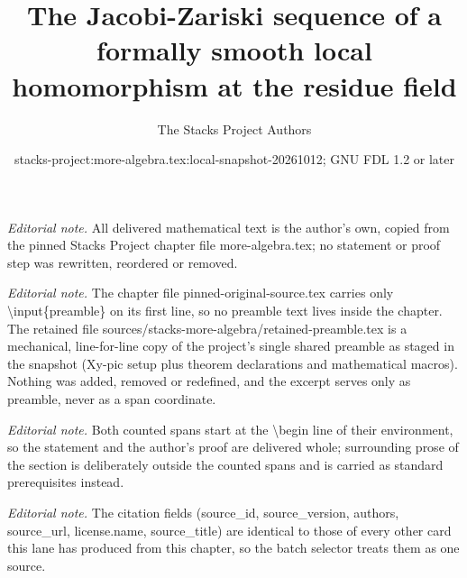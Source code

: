 \documentclass[10pt,a4paper]{amsart}
\title{The Jacobi-Zariski sequence of a formally smooth local homomorphism at the residue field}
\author{The Stacks Project Authors}
\date{stacks-project:more-algebra.tex:local-snapshot-20261012; GNU FDL 1.2 or later}
\theoremstyle{plain}
\theoremstyle{definition}
\theoremstyle{remark}
\numberwithin{equation}{subsection}
\begin{document}
\maketitle
\setcounter{subsection}{1}
\noindent\textit{Editorial note.} All delivered mathematical text is the author's own, copied from the pinned Stacks Project chapter file more-algebra.tex; no statement or proof step was rewritten, reordered or removed.\par\medskip
\noindent\textit{Editorial note.} The chapter file pinned-original-source.tex carries only \textbackslash{}input\{preamble\} on its first line, so no preamble text lives inside the chapter. The retained file sources/stacks-more-algebra/retained-preamble.tex is a mechanical, line-for-line copy of the project's single shared preamble as staged in the snapshot (Xy-pic setup plus theorem declarations and mathematical macros). Nothing was added, removed or redefined, and the excerpt serves only as preamble, never as a span coordinate.\par\medskip
\noindent\textit{Editorial note.} Both counted spans start at the \textbackslash{}begin line of their environment, so the statement and the author's proof are delivered whole; surrounding prose of the section is deliberately outside the counted spans and is carried as standard prerequisites instead.\par\medskip
\noindent\textit{Editorial note.} The citation fields (source\_id, source\_version, authors, source\_url, license.name, source\_title) are identical to those of every other card this lane has produced from this chapter, so the batch selector treats them as one source.\par\medskip
\end{document}
